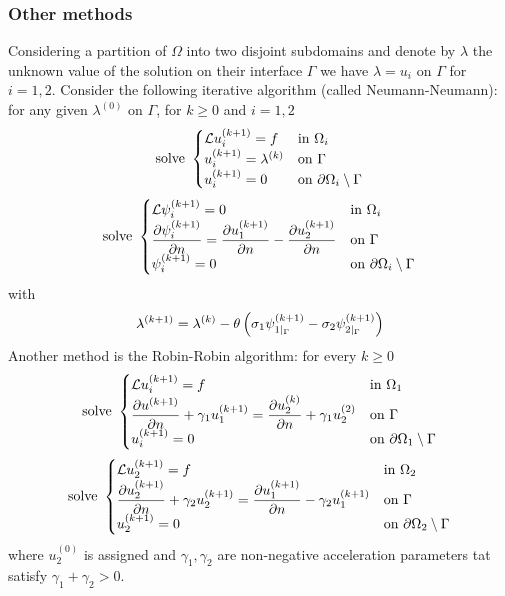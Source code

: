 \subsubsection*{Other methods}
Considering a partition of \(\Omega\) into two disjoint subdomains and denote by \(\lambda\) the unknown value of the solution on their interface \(\Gamma\) we have \(\lambda = u_i\) on \(\Gamma\) for \(i=1,2\).
Consider the following iterative algorithm (called Neumann-Neumann): for any given \(\lambda^{(0)}\) on \(\Gamma\), for \(k \geq 0\) and \(i = 1,2\)
\begin{equation*}
    \text{solve }\begin{cases}
        \mathcal{L} u^{(k+1)}_i = f & \text{in } \Omega_i \\
        u^{(k+1)}_i = \lambda^{(k)} & \text{on } \Gamma \\
        u^{(k+1)}_i = 0 & \text{on } {\partial\Omega}_i\setminus \Gamma
    \end{cases}
\end{equation*}
\begin{equation*}
    \txt{solve }\begin{cases}
        \loperator \psi^{(k+1)}_i = 0 & \txt{in } \Omega_i \\
        \displaystyle \partialderivative{\psi^{(k+1)}_i}{n} = \partialderivative{u_1^{(k+1)}}{n} - \partialderivative{u^{(k+1)}_2}{n} & \txt{on } \Gamma \\
        \psi^{(k+1)}_i = 0 & \txt{on } \boundary_i\setminus \Gamma
    \end{cases}
\end{equation*}
with 
\[
    \lambda^{(k+1)} = \lambda^{(k)} - \theta\left( \sigma_1 \psi^{(k+1)}_{1\vert_{\Gamma}} - \sigma_2\psi^{(k+1)}_{2\vert_{\Gamma}} \right)
\]
Another method is the Robin-Robin algorithm: for every \(k\geq 0\) 
\begin{equation*}
    \txt{solve }\begin{cases}
        \loperator u^{(k+1)}_i = f & \txt{in } \Omega_1 \\
        \displaystyle \partialderivative{u^{(k+1)}}{n} + \gamma_1u_1^{(k+1)} = \partialderivative{u_2^{(k)}}{n} + \gamma_1u_2^{(2)} & \txt{on } \Gamma \\
        u^{(k+1)}_i = 0 & \txt{on } \boundary_1\setminus \Gamma
    \end{cases}
\end{equation*}
\begin{equation*}
    \txt{solve }\begin{cases}
        \loperator u^{(k+1)}_2 = f & \txt{in } \Omega_2 \\
        \displaystyle \partialderivative{u^{(k+1)}_2}{n} + \gamma_2u_2^{(k+1)} = \partialderivative{u_1^{(k+1)}}{n} - \gamma_2u_1^{(k+1)} & \txt{on } \Gamma \\
        u^{(k+1)}_2 = 0 & \txt{on } \boundary_2\setminus \Gamma
    \end{cases}
\end{equation*}
where \(u^{(0)}_2\) is assigned and \(\gamma_1,\gamma_2\) are non-negative acceleration parameters tat satisfy \(\gamma_1+\gamma_2 > 0\). 
